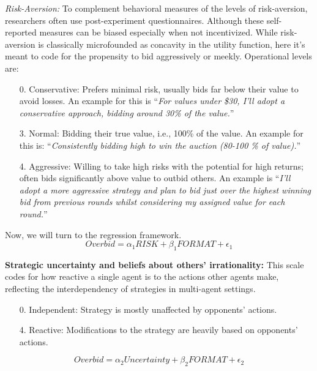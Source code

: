 \documentclass{article} %
\begin{document}
\textit{Risk-Aversion:} To complement behavioral measures of the levels of risk-aversion, researchers often use post-experiment questionnaires.
Although these self-reported measures can be biased especially when not incentivized. While risk-aversion is classically microfounded as concavity in the utility function, here it's meant to code for the propensity to bid aggressively or meekly. Operational levels are: 
\begin{enumerate}
    \item[0.] Conservative: Prefers minimal risk, usually bids far below their value to avoid losses. 
    An example for this is ``\textit{For values under \$30, I'll adopt a conservative approach, bidding around 30\% of the value.}''
    \item[3. ] Normal: Bidding their true value, i.e., 100\% of the value. 
    An example for this is:         ``\textit{Consistently bidding high to win the auction (80-100
    \% of value).}''
    \item[4. ] Aggressive: Willing to take high risks with the potential for high returns; often bids significantly above value to outbid others. An example is ``\textit{I'll adopt a more aggressive strategy and plan to bid just over the highest winning bid from previous rounds whilst considering my assigned value for each round.}''  
\end{enumerate}

Now, we will turn to the regression framework.
\begin{equation}
    Overbid = \alpha_1 RISK + \beta_1 FORMAT + \epsilon_1
\end{equation}



\textbf{Strategic uncertainty and beliefs about others' irrationality:} This scale codes for how reactive a single agent is to the actions other agents make, reflecting the interdependency of strategies in multi-agent settings.

\begin{enumerate}
    \item[0.] Independent: Strategy is mostly unaffected by opponents' actions. 
    \item[4.] Reactive: Modifications to the strategy are heavily based on opponents' actions. 
\end{enumerate}

\begin{equation}
    Overbid = \alpha_2 Uncertainty  + \beta_2  FORMAT + \epsilon_2
\end{equation}
\end{document}
